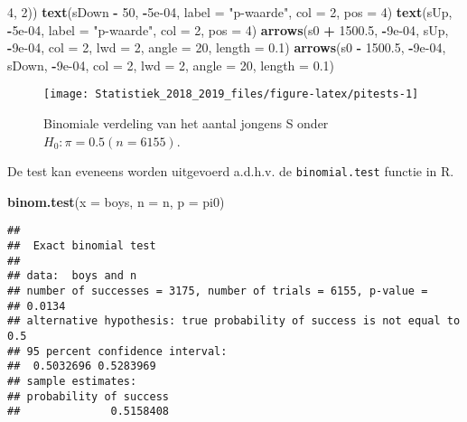 \documentclass[12pt,dutch,coursenotes]{book}
\newenvironment{Shaded}{\begin{snugshade}}{\end{snugshade}}
\newcommand{\KeywordTok}[1]{\textcolor[rgb]{0.13,0.29,0.53}{\textbf{#1}}}
\newcommand{\DataTypeTok}[1]{\textcolor[rgb]{0.13,0.29,0.53}{#1}}
\newcommand{\DecValTok}[1]{\textcolor[rgb]{0.00,0.00,0.81}{#1}}
\newcommand{\FloatTok}[1]{\textcolor[rgb]{0.00,0.00,0.81}{#1}}
\newcommand{\StringTok}[1]{\textcolor[rgb]{0.31,0.60,0.02}{#1}}
\newcommand{\OperatorTok}[1]{\textcolor[rgb]{0.81,0.36,0.00}{\textbf{#1}}}
\newcommand{\NormalTok}[1]{#1}
\theoremstyle{definition}
\theoremstyle{definition}
\theoremstyle{definition}
\theoremstyle{remark}
\begin{document}
\begin{Shaded}
\begin{Highlighting}[]
        \DecValTok{4}\NormalTok{, }\DecValTok{2}\NormalTok{))}
\KeywordTok{text}\NormalTok{(sDown }\OperatorTok{-}\StringTok{ }\DecValTok{50}\NormalTok{, }\OperatorTok{-}\FloatTok{5e-04}\NormalTok{, }\DataTypeTok{label =} \StringTok{"p-waarde"}\NormalTok{, }\DataTypeTok{col =} \DecValTok{2}\NormalTok{, }
    \DataTypeTok{pos =} \DecValTok{4}\NormalTok{)}
\KeywordTok{text}\NormalTok{(sUp, }\OperatorTok{-}\FloatTok{5e-04}\NormalTok{, }\DataTypeTok{label =} \StringTok{"p-waarde"}\NormalTok{, }\DataTypeTok{col =} \DecValTok{2}\NormalTok{, }\DataTypeTok{pos =} \DecValTok{4}\NormalTok{)}
\KeywordTok{arrows}\NormalTok{(s0 }\OperatorTok{+}\StringTok{ }\FloatTok{1500.5}\NormalTok{, }\OperatorTok{-}\FloatTok{9e-04}\NormalTok{, sUp, }\OperatorTok{-}\FloatTok{9e-04}\NormalTok{, }\DataTypeTok{col =} \DecValTok{2}\NormalTok{, }\DataTypeTok{lwd =} \DecValTok{2}\NormalTok{, }
    \DataTypeTok{angle =} \DecValTok{20}\NormalTok{, }\DataTypeTok{length =} \FloatTok{0.1}\NormalTok{)}
\KeywordTok{arrows}\NormalTok{(s0 }\OperatorTok{-}\StringTok{ }\FloatTok{1500.5}\NormalTok{, }\OperatorTok{-}\FloatTok{9e-04}\NormalTok{, sDown, }\OperatorTok{-}\FloatTok{9e-04}\NormalTok{, }\DataTypeTok{col =} \DecValTok{2}\NormalTok{, }
    \DataTypeTok{lwd =} \DecValTok{2}\NormalTok{, }\DataTypeTok{angle =} \DecValTok{20}\NormalTok{, }\DataTypeTok{length =} \FloatTok{0.1}\NormalTok{)}
\end{Highlighting}
\end{Shaded}

\begin{figure}

{\centering \texttt{[image: Statistiek\_2018\_2019\_files/figure-latex/pitests-1]} 

}

\caption{Binomiale verdeling van het aantal jongens S onder $H_0: \pi=0.5 (n=6155)$.}\label{fig:pitests}
\end{figure}

De test kan eveneens worden uitgevoerd a.d.h.v. de
\texttt{binomial.test} functie in R.

\begin{Shaded}
\begin{Highlighting}[]
\KeywordTok{binom.test}\NormalTok{(}\DataTypeTok{x =}\NormalTok{ boys, }\DataTypeTok{n =}\NormalTok{ n, }\DataTypeTok{p =}\NormalTok{ pi0)}
\end{Highlighting}
\end{Shaded}

\begin{verbatim}
## 
##  Exact binomial test
## 
## data:  boys and n
## number of successes = 3175, number of trials = 6155, p-value =
## 0.0134
## alternative hypothesis: true probability of success is not equal to 0.5
## 95 percent confidence interval:
##  0.5032696 0.5283969
## sample estimates:
## probability of success 
##              0.5158408
\end{verbatim}
\end{document}
